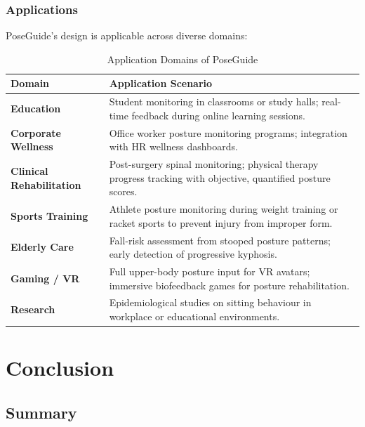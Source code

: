 \documentclass[12pt,a4paper]{report}
\begin{document}
\subsection{Applications}

PoseGuide's design is applicable across diverse domains:

\begin{table}[H]
\centering
\caption{Application Domains of PoseGuide}
\label{tab:applications}
\begin{tabularx}{\columnwidth}{lX}
\toprule
\textbf{Domain} & \textbf{Application Scenario} \\
\midrule
\textbf{Education} & Student monitoring in classrooms or study halls; real-time feedback during online learning sessions.\\[3pt]
\textbf{Corporate Wellness} & Office worker posture monitoring programs; integration with HR wellness dashboards.\\[3pt]
\textbf{Clinical Rehabilitation} & Post-surgery spinal monitoring; physical therapy progress tracking with objective, quantified posture scores.\\[3pt]
\textbf{Sports Training} & Athlete posture monitoring during weight training or racket sports to prevent injury from improper form.\\[3pt]
\textbf{Elderly Care} & Fall-risk assessment from stooped posture patterns; early detection of progressive kyphosis.\\[3pt]
\textbf{Gaming / VR} & Full upper-body posture input for VR avatars; immersive biofeedback games for posture rehabilitation.\\[3pt]
\textbf{Research} & Epidemiological studies on sitting behaviour in workplace or educational environments.\\
\bottomrule
\end{tabularx}
\end{table}


\chapter{Conclusion}

\section{Summary}
\end{document}
